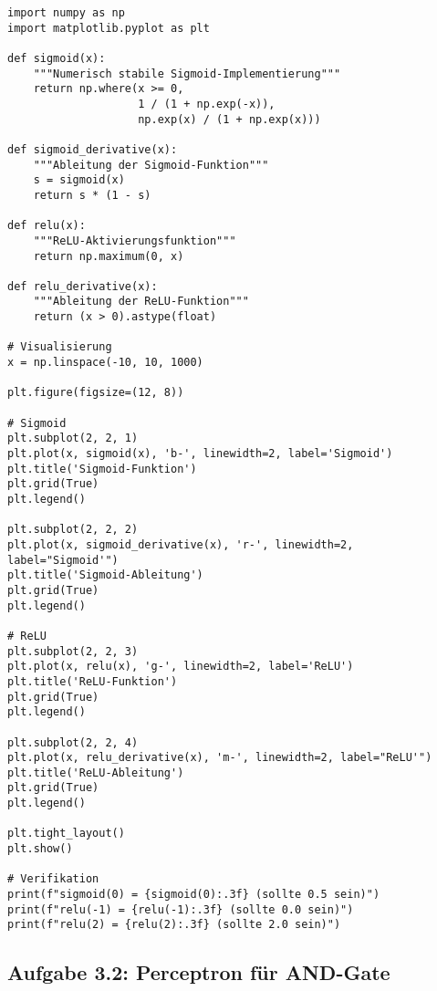 \documentclass[12pt,a4paper]{article}
\begin{document}
\begin{lstlisting}[caption=Aktivierungsfunktionen mit NumPy]
import numpy as np
import matplotlib.pyplot as plt

def sigmoid(x):
    """Numerisch stabile Sigmoid-Implementierung"""
    return np.where(x >= 0, 
                    1 / (1 + np.exp(-x)), 
                    np.exp(x) / (1 + np.exp(x)))

def sigmoid_derivative(x):
    """Ableitung der Sigmoid-Funktion"""
    s = sigmoid(x)
    return s * (1 - s)

def relu(x):
    """ReLU-Aktivierungsfunktion"""
    return np.maximum(0, x)

def relu_derivative(x):
    """Ableitung der ReLU-Funktion"""
    return (x > 0).astype(float)

# Visualisierung
x = np.linspace(-10, 10, 1000)

plt.figure(figsize=(12, 8))

# Sigmoid
plt.subplot(2, 2, 1)
plt.plot(x, sigmoid(x), 'b-', linewidth=2, label='Sigmoid')
plt.title('Sigmoid-Funktion')
plt.grid(True)
plt.legend()

plt.subplot(2, 2, 2)
plt.plot(x, sigmoid_derivative(x), 'r-', linewidth=2, label="Sigmoid'")
plt.title('Sigmoid-Ableitung')
plt.grid(True)
plt.legend()

# ReLU
plt.subplot(2, 2, 3)
plt.plot(x, relu(x), 'g-', linewidth=2, label='ReLU')
plt.title('ReLU-Funktion')
plt.grid(True)
plt.legend()

plt.subplot(2, 2, 4)
plt.plot(x, relu_derivative(x), 'm-', linewidth=2, label="ReLU'")
plt.title('ReLU-Ableitung')
plt.grid(True)
plt.legend()

plt.tight_layout()
plt.show()

# Verifikation
print(f"sigmoid(0) = {sigmoid(0):.3f} (sollte 0.5 sein)")
print(f"relu(-1) = {relu(-1):.3f} (sollte 0.0 sein)")
print(f"relu(2) = {relu(2):.3f} (sollte 2.0 sein)")
\end{lstlisting}

\subsection{Aufgabe 3.2: Perceptron für AND-Gate}
\end{document}
